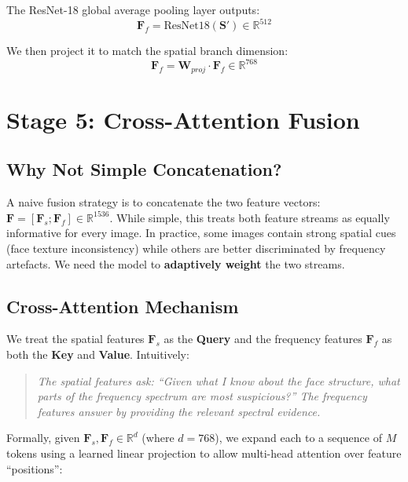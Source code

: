 \documentclass[12pt,a4paper]{article}
\begin{document}
The ResNet-18 global average pooling layer outputs:
\begin{equation}
  \mathbf{F}_f = \text{ResNet18}(\mathbf{S}') \in \mathbb{R}^{512}
\end{equation}

We then project it to match the spatial branch dimension:
\begin{equation}
  \mathbf{F}_f = \mathbf{W}_{proj} \cdot \mathbf{F}_f \in \mathbb{R}^{768}
\end{equation}

\newpage

\section{Stage 5: Cross-Attention Fusion}

\subsection{Why Not Simple Concatenation?}

A naive fusion strategy is to concatenate the two feature vectors:
$\mathbf{F} = [\mathbf{F}_s; \mathbf{F}_f] \in \mathbb{R}^{1536}$.
While simple, this treats both feature streams as equally informative for every image.
In practice, some images contain strong spatial cues (face texture inconsistency) while
others are better discriminated by frequency artefacts. We need the model to
\textbf{adaptively weight} the two streams.

\subsection{Cross-Attention Mechanism}

We treat the spatial features $\mathbf{F}_s$ as the \textbf{Query} and the frequency
features $\mathbf{F}_f$ as both the \textbf{Key} and \textbf{Value}. Intuitively:

\begin{quote}
\textit{The spatial features ask: ``Given what I know about the face structure, what
parts of the frequency spectrum are most suspicious?'' The frequency features answer
by providing the relevant spectral evidence.}
\end{quote}

Formally, given $\mathbf{F}_s, \mathbf{F}_f \in \mathbb{R}^d$ (where $d = 768$), we
expand each to a sequence of $M$ tokens using a learned linear projection to allow
multi-head attention over feature ``positions'':
\end{document}
